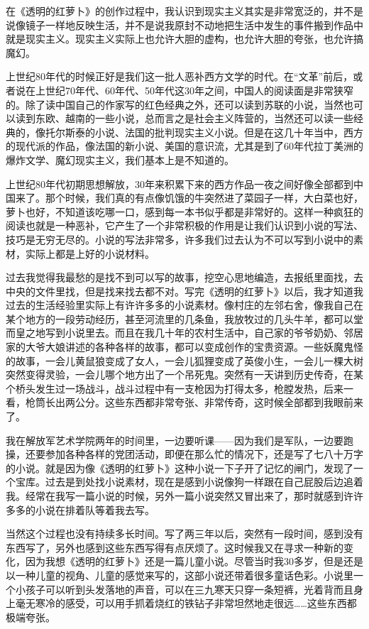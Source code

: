 \documentclass[fontset=fandol,12pt,a5paper]{ctexbook}
\begin{document}
在《透明的红萝卜》的创作过程中，我认识到现实主义其实是非常宽泛的，并不是说像镜子一样地反映生活，并不是说我原封不动地把生活中发生的事件搬到作品中就是现实主义。现实主义实际上也允许大胆的虚构，也允许大胆的夸张，也允许搞魔幻。

上世纪80年代的时候正好是我们这一批人恶补西方文学的时代。在“文革”前后，或者说在上世纪70年代、60年代、50年代这30年之间，中国人的阅读面是非常狭窄的。除了读中国自己的作家写的红色经典之外，还可以读到苏联的小说，当然也可以读到东欧、越南的一些小说，总而言之是社会主义阵营的，当然还可以读一些经典的，像托尔斯泰的小说、法国的批判现实主义小说。但是在这几十年当中，西方的现代派的作品，像法国的新小说、美国的意识流，尤其是到了60年代拉丁美洲的爆炸文学、魔幻现实主义，我们基本上是不知道的。

上世纪80年代初期思想解放，30年来积累下来的西方作品一夜之间好像全部都到中国来了。那个时候，我们真的有点像饥饿的牛突然进了菜园子一样，大白菜也好，萝卜也好，不知道该吃哪一口，感到每一本书似乎都是非常好的。这样一种疯狂的阅读也就是一种恶补，它产生了一个非常积极的作用是让我们认识到小说的写法、技巧是无穷无尽的。小说的写法非常多，许多我们过去认为不可以写到小说中的素材，实际上都是上好的小说材料。

过去我觉得我最愁的是找不到可以写的故事，挖空心思地编造，去报纸里面找，去中央的文件里找，但是找来找去都不对。写完《透明的红萝卜》以后，我才知道我过去的生活经验里实际上有许许多多的小说素材。像村庄的左邻右舍，像我自己在某个地方的一段劳动经历，甚至河流里的几条鱼，我放牧过的几头牛羊，都可以堂而皇之地写到小说里去。而且在我几十年的农村生活中，自己家的爷爷奶奶、邻居家的大爷大娘讲述的各种各样的故事，都可以变成创作的宝贵资源。一些妖魔鬼怪的故事，一会儿黄鼠狼变成了女人，一会儿狐狸变成了英俊小生，一会儿一棵大树突然变得灵验，一会儿哪个地方出了一个吊死鬼。突然有一天讲到历史传奇，在某个桥头发生过一场战斗，战斗过程中有一支枪因为打得太多，枪膛发热，后来一看，枪筒长出两公分。这些东西都非常夸张、非常传奇，这时候全部都到我眼前来了。

我在解放军艺术学院两年的时间里，一边要听课——因为我们是军队，一边要跑操，还要参加各种各样的党团活动，即便在那么忙的情况下，还是写了七八十万字的小说。就是因为像《透明的红萝卜》这种小说一下子开了记忆的闸门，发现了一个宝库。过去是到处找小说素材，现在是感到小说像狗一样跟在自己屁股后边追着我。经常在我写一篇小说的时候，另外一篇小说突然又冒出来了，那时就感到许许多多的小说在排着队等着我去写。

当然这个过程也没有持续多长时间。写了两三年以后，突然有一段时间，感到没有东西写了，另外也感到这些东西写得有点厌烦了。这时候我又在寻求一种新的变化，因为我想《透明的红萝卜》还是一篇儿童小说。尽管当时我30多岁，但是还是以一种儿童的视角、儿童的感觉来写的，这部小说还带着很多童话色彩。小说里一个小孩子可以听到头发落地的声音，可以在三九寒天只穿一条短裤，光着背而且身上毫无寒冷的感受，可以用手抓着烧红的铁钻子非常坦然地走很远……这些东西都极端夸张。
\end{document}
